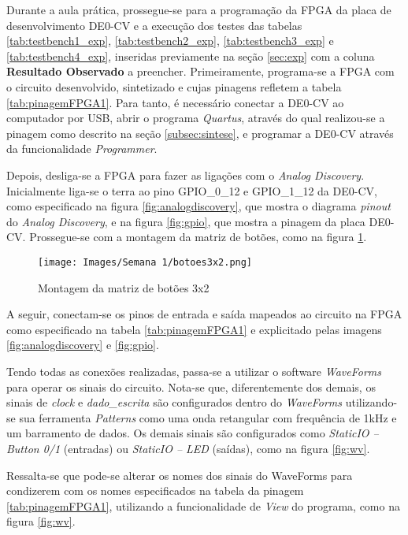 \documentclass[amsmath,amssymb,floatfix]{report}
\begin{document}
Durante a aula prática, prossegue-se para a programação da FPGA da placa de desenvolvimento DE0-CV e a execução dos testes das tabelas \ref{tab:testbench1_exp}, \ref{tab:testbench2_exp}, \ref{tab:testbench3_exp} e \ref{tab:testbench4_exp}, inseridas previamente na seção \ref{sec:exp} com a coluna \textbf{Resultado Observado} a preencher. Primeiramente, programa-se a FPGA com o circuito desenvolvido, sintetizado e cujas pinagens refletem a tabela \ref{tab:pinagemFPGA1}. Para tanto, é necessário conectar a DE0-CV ao computador por USB, abrir o programa \textit{Quartus}, através do qual realizou-se a pinagem como descrito na seção \ref{subsec:sintese}, e programar a DE0-CV através da funcionalidade \textit{Programmer}. 

Depois, desliga-se a FPGA para fazer as ligações com o \textit{Analog Discovery}. Inicialmente liga-se o terra ao pino GPIO\_0\_12 e GPIO\_1\_12 da DE0-CV, como especificado na figura \ref{fig:analogdiscovery}, que mostra o diagrama \textit{pinout} do \textit{Analog Discovery}, e na figura \ref{fig:gpio}, que mostra a pinagem da placa DE0-CV. Prossegue-se com a montagem da matriz de botões, como na figura \ref{fig:botoes3x2}.

\begin{figure}[H]
\centering
\texttt{[image: Images/Semana 1/botoes3x2.png]} 
    \caption{Montagem da matriz de botões 3x2}
    \label{fig:botoes3x2}
\end{figure}


A seguir, conectam-se os pinos de entrada e saída mapeados ao circuito na FPGA como especificado na tabela \ref{tab:pinagemFPGA1} e explicitado pelas imagens \ref{fig:analogdiscovery} e \ref{fig:gpio}.

Tendo todas as conexões realizadas, passa-se a utilizar o software \textit{WaveForms} para operar os sinais do circuito. Nota-se que, diferentemente dos demais, os sinais de \textit{clock} e \textit{dado\_escrita} são configurados dentro do \textit{WaveForms} utilizando-se sua ferramenta \textit{Patterns} como uma onda retangular com frequência de 1kHz e um barramento de dados. Os demais sinais são configurados como \textit{StaticIO -- Button 0/1} (entradas) ou \textit{StaticIO -- LED} (saídas), como na figura \ref{fig:wv}.

Ressalta-se que pode-se alterar os nomes dos sinais do WaveForms para condizerem com os nomes especificados na tabela da pinagem \ref{tab:pinagemFPGA1}, utilizando a funcionalidade de \textit{View} do programa, como na figura \ref{fig:wv}.
\end{document}
